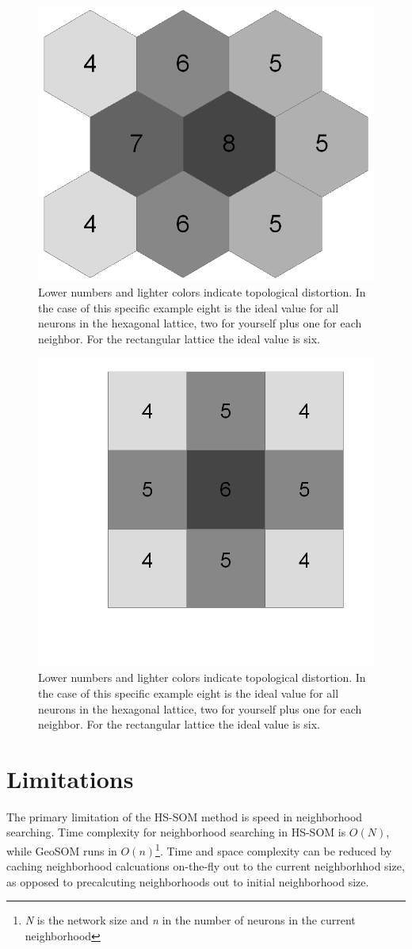 \documentclass[12pt]{article}
\begin{document}
\begin{figure}
\centering
\includegraphics[width=0.4\linewidth]{figure_hex.png}
\caption{Lower numbers and lighter colors indicate topological distortion.
In the case of this specific example eight is the ideal value for all neurons
in the hexagonal lattice, two for yourself plus one for each neighbor.  For
the rectangular lattice the ideal value is six.}
\label{figure2}
\end{figure}

\begin{figure}
\centering
\includegraphics[width=0.4\linewidth]{figure_rect.png}
\caption{Lower numbers and lighter colors indicate topological distortion.  In
the case of this specific example eight is the ideal value for all neurons in
the hexagonal lattice, two for yourself plus one for each neighbor.  For the
rectangular lattice the ideal value is six.}
\label{figure3}
\end{figure}

\section{Limitations}
The primary limitation of the HS-SOM method is speed in neighborhood
searching. Time complexity for neighborhood searching in HS-SOM is
\begin{math}O(N)\end{math}, while GeoSOM runs in
\begin{math}O(n)\end{math}\footnote{\textit{N} is the network size and
\textit{n} in the number of neurons in the current
neighborhood}\citep{Wu:2006lr}. Time and space complexity can be reduced by
caching neighborhood calcuations on-the-fly out to the current neighborhhod
size, as opposed to precalcuting neighborhoods out to initial neighborhood
size.
\end{document}
